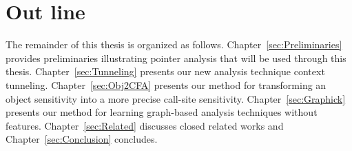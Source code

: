 \section{Out line}
The remainder of this thesis is organized as follows.
Chapter~{\ref{sec:Preliminaries}} provides preliminaries illustrating pointer analysis that will be used through this thesis.
Chapter~{\ref{sec:Tunneling}} presents our new analysis technique context tunneling. 
Chapter~{\ref{sec:Obj2CFA}} presents our method for transforming an object sensitivity into a more precise call-site sensitivity.
Chapter~{\ref{sec:Graphick}} presents our method for learning graph-based analysis techniques without features.
Chapter~{\ref{sec:Related}} discusses closed related works and
Chapter~{\ref{sec:Conclusion}} concludes.
%
%
%
%
%
%
%
%
%






